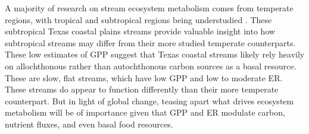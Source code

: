 A majority of research on stream ecosystem metabolism comes from temperate regions, with tropical and subtropical regions being understudied \cite{marzolfEcosystemMetabolismTropical2021}. These subtropical Texas coastal plains streams provide valuable insight into how subtropical streams may differ from their more studied temperate counterparts. These low estimates of GPP suggest that Texas coastal streams likely rely heavily on allochthonous rather than autochthonous carbon sources as a basal resource. These are slow, flat streams, which have low GPP and low to moderate ER. These streams do appear to function differently than their more temperate counterpart. But in light of global change, teasing apart what drives ecosystem metabolism will be of importance given that GPP and ER modulate carbon, nutrient fluxes, and even basal food resources.













\endinput

